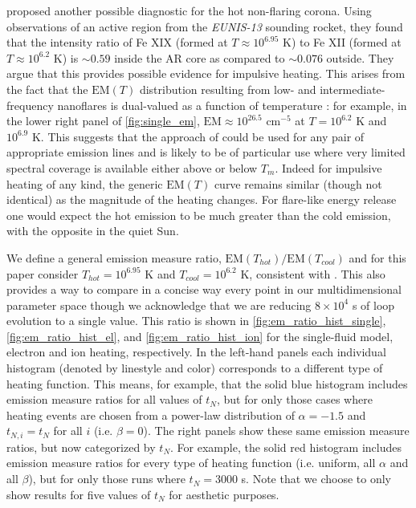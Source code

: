 \documentclass[preprint,linenumbers]{aastex}
\begin{document}
		\par\citet{brosius_pervasive_2014} proposed another possible diagnostic for the hot non-flaring corona. Using observations of an active region from the \textit{EUNIS-13} sounding rocket, they found that the intensity ratio of Fe XIX (formed at $T\approx10^{6.95}$ K) to Fe XII (formed at $T\approx10^{6.2}$ K) is $\sim0.59$ inside the AR core as compared to $\sim0.076$ outside. They argue that this provides possible evidence for impulsive heating. This arises from the fact that the $\mathrm{EM}(T)$ distribution resulting from low- and intermediate-frequency nanoflares is dual-valued as a function of temperature \citep[see \autoref{fig:single_em}-\autoref{fig:ion_em} and][]{cargill_implications_1994}: for example, in the lower right panel of \autoref{fig:single_em}, $\mathrm{EM}\approx 10^{26.5}$ cm$^{-5}$ at $T = 10^{6.2}$ K and $10^{6.9}$ K. This suggests that the approach of \citet{brosius_pervasive_2014} could be used for any pair of appropriate emission lines and is likely to be of particular use where very limited spectral coverage is available either above or below $T_m$. Indeed for impulsive heating of any kind, the generic $\mathrm{EM}(T)$ curve remains similar (though not identical) as the magnitude of the heating changes. For flare-like energy release one would expect the hot emission to be much greater than the cold emission, with the opposite in the quiet Sun.

	\par We define a general emission measure ratio, $\mathrm{EM}(T_{hot})/\mathrm{EM}(T_{cool})$ and for this paper consider $T_{hot}=10^{6.95}$ K and $T_{cool}=10^{6.2}$ K, consistent with \citet{brosius_pervasive_2014}. This also provides a way to compare in a concise way every point in our multidimensional parameter space though we acknowledge that we are reducing $8\times10^4$ s of loop evolution to a single value. This ratio is shown in \autoref{fig:em_ratio_hist_single}, \autoref{fig:em_ratio_hist_el}, and \autoref{fig:em_ratio_hist_ion} for the single-fluid model, electron and ion heating, respectively. In the left-hand panels each individual histogram (denoted by linestyle and color) corresponds to a different type of heating function. This means, for example, that the solid blue histogram includes emission measure ratios for all values of $t_N$, but for only those cases where heating events are chosen from a power-law distribution of $\alpha=-1.5$ and $t_{N,i}=t_N$ for all $i$ (i.e. $\beta=0$). The right panels show these same emission measure ratios, but now categorized by $t_N$. For example, the solid red histogram includes emission measure ratios for every type of heating function (i.e. uniform, all $\alpha$ and all $\beta$), but for only those runs where $t_N=3000$ s. Note that we choose to only show results for five values of $t_N$ for aesthetic purposes. 
\end{document}
